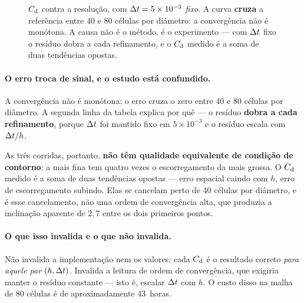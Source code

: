 \begin{figure}[htbp]
\centering
{}
\caption{$C_{\mathrm{d}}$ contra a resolução, com $\Delta t = 5\times10^{-3}$ \emph{fixo}. A
curva \textbf{cruza} a referência entre 40 e 80 células por diâmetro: a
convergência não é monótona. A causa não é o método, é o experimento --- com
$\Delta t$ fixo o resíduo dobra a cada refinamento, e o $C_{\mathrm{d}}$ medido é a soma de duas
tendências opostas.}
\label{fig:cd-refino}
\end{figure}

\paragraph{O erro troca de sinal, e o estudo está confundido.} A convergência
não é monótona: o erro cruza o zero entre 40 e 80 células por diâmetro. A
segunda linha da tabela explica por quê --- o resíduo \textbf{dobra a cada
refinamento}, porque $\Delta t$ foi mantido fixo em $5\times10^{-3}$ e o resíduo
escala com $\Delta t/h$.

As três corridas, portanto, \textbf{não têm qualidade equivalente de condição de
contorno}: a mais fina tem quatro vezes o escorregamento da mais grossa. O $C_{\mathrm{d}}$
medido é a soma de duas tendências opostas --- erro espacial caindo com $h$, erro
de escorregamento subindo. Elas se cancelam perto de 40 células por diâmetro, e é
esse cancelamento, não uma ordem de convergência alta, que produzia a inclinação
aparente de $2{,}7$ entre os dois primeiros pontos.

\paragraph{O que isso invalida e o que não invalida.} Não invalida a
implementação nem os valores: cada $C_{\mathrm{d}}$ é o resultado correto \emph{para
aquele par} $(h,\Delta t)$. Invalida a leitura de ordem de convergência, que exigiria
manter o resíduo constante --- isto é, escalar $\Delta t$ com $h$. O custo disso na
malha de 80 células é de aproximadamente 43~horas.

